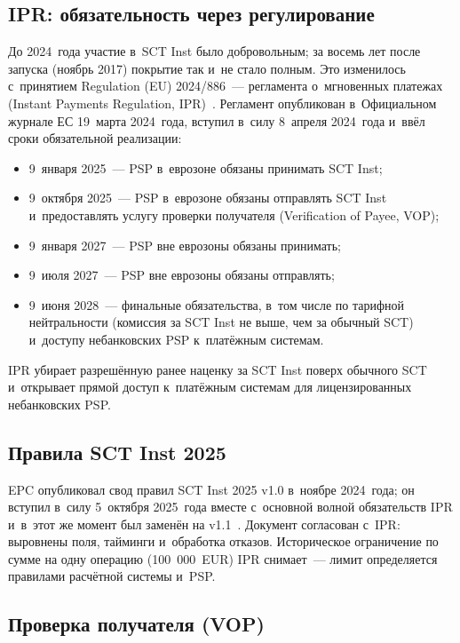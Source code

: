 \subsection*{IPR: обязательность через регулирование}\label{subsec:sepa-ipr}

До 2024~года участие в~SCT Inst было добровольным; за восемь лет
после запуска (ноябрь 2017) покрытие так и~не стало полным. Это
изменилось с~принятием Regulation (EU) 2024/886~--- регламента
о~мгновенных платежах (Instant Payments Regulation, IPR)~\cite{eu-2024-886,ecb-ipr}. Регламент
опубликован в~Официальном журнале ЕС 19~марта 2024~года, вступил
в~силу 8~апреля 2024~года и~ввёл сроки обязательной реализации:

\begin{itemize}
  \item 9~января 2025~--- PSP в~еврозоне обязаны принимать
        SCT Inst;
  \item 9~октября 2025~--- PSP в~еврозоне обязаны отправлять
        SCT Inst и~предоставлять услугу проверки получателя (Verification of Payee, VOP);
  \item 9~января 2027~--- PSP вне еврозоны обязаны принимать;
  \item 9~июля 2027~--- PSP вне еврозоны обязаны отправлять;
  \item 9~июня 2028~--- финальные обязательства, в~том числе по тарифной
        нейтральности (комиссия за SCT Inst не выше, чем за обычный SCT)
        и~доступу небанковских PSP к~платёжным системам.
\end{itemize}

IPR убирает разрешённую ранее наценку за SCT Inst поверх обычного
SCT и~открывает прямой доступ к~платёжным системам для лицензированных
небанковских PSP.

\subsection*{Правила SCT Inst 2025}\label{subsec:sepa-rulebook}

EPC опубликовал свод правил SCT Inst 2025 v1.0 в~ноябре 2024~года;
он вступил в~силу 5~октября 2025~года вместе с~основной волной
обязательств IPR и~в~этот же момент был заменён на
v1.1~\cite{epc-sct-inst-rulebook-2025}. Документ согласован
с~IPR: выровнены поля, тайминги и~обработка отказов. Историческое
ограничение по сумме на одну операцию (100~000~EUR) IPR снимает~---
лимит определяется правилами расчётной системы и~PSP.

\subsection*{Проверка получателя (VOP)}\label{subsec:sepa-vop}

